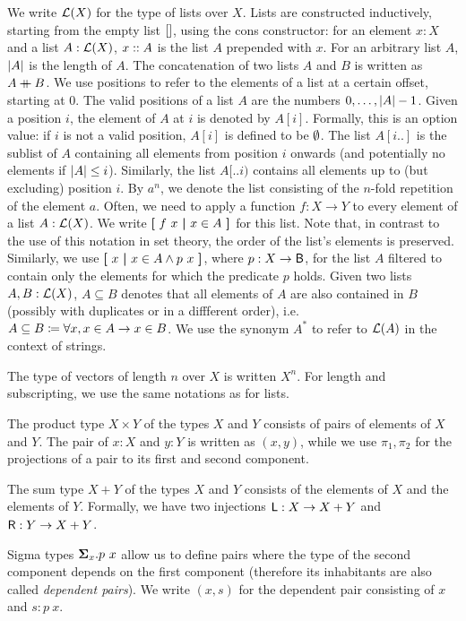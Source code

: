 We write $\mathcal{L} (X)$ for the type of lists over $X$. Lists are constructed inductively, starting from the empty list $[]$, using the cons constructor: for an element $x : X$ and a list $A : \mathcal{L} (X)$, $x::{} A$ is the list $A$ prepended with $x$.
For an arbitrary list $A$, $|A|$ is the length of $A$. 
The concatenation of two lists $A$ and $B$ is written as $A \mathbin{+\mkern-10mu+}{} B$. 
We use positions to refer to the elements of a list at a certain offset, starting at 0. The valid positions of a list $A$ are the numbers $0, \ldots, |A|-1$. 
Given a position $i$, the element of $A$ at $i$ is denoted by $A[i]$. Formally, this is an option value: if $i$ is not a valid position, $A[i]$ is defined to be $\emptyset{}$. 
The list $A[i..]$ is the sublist of $A$ containing all elements from position $i$ onwards (and potentially no elements if $|A| \le i$). Similarly, the list $A[..i)$ contains all elements up to (but excluding) position $i$. 
By $a^n$, we denote the list consisting of the $n$-fold repetition of the element $a$.
Often, we need to apply a function $f : X \rightarrow Y$ to every element of a list $A : \mathcal{L} (X)$. We write $\textbf{[}~ f~x ~\textbf{|}~ x \in A ~\textbf{]}$ for this list. Note that, in contrast to the use of this notation in set theory, the order of the list's elements is preserved. 
Similarly, we use $\textbf{[}~ x ~\textbf{|}~ x \in A \land p~x ~\textbf{]}$, where $p : X \rightarrow \textsf{B}$, for the list $A$ filtered to contain only the elements for which the predicate $p$ holds.
Given two lists $A, B : \mathcal{L} (X)$, $A \subseteq B$ denotes that all elements of $A$ are also contained in $B$ (possibly with duplicates or in a diffferent order), i.e.\ $A \subseteq B \coloneqq \forall x, x \in A \rightarrow x \in B$. 
We use the synonym $A^*$ to refer to $\mathcal{L} (A)$ in the context of strings.

The type of vectors of length $n$ over $X$ is written $X^n$. For length and subscripting, we use the same notations as for lists.

The product type $X \times Y$ of the types $X$ and $Y$ consists of pairs of elements of $X$ and $Y$. The pair of $x : X$ and $y : Y$ is written as $(x, y)$, while we use $\pi_1, \pi_2$ for the projections of a pair to its first and second component. 

The sum type $X + Y$ of the types $X$ and $Y$ consists of the elements of $X$ and the elements of $Y$. Formally, we have two injections $\textsf{L} : X \rightarrow X + Y$ and $\textsf{R} : Y \rightarrow X + Y$. 

Sigma types $\bm{\Sigma}_{x}.p~x$ allow us to define pairs where the type of the second component depends on the first component (therefore its inhabitants are also called \textit{dependent pairs}). We write $(x, s)$ for the dependent pair consisting of $x$ and $s : p~x$. 

